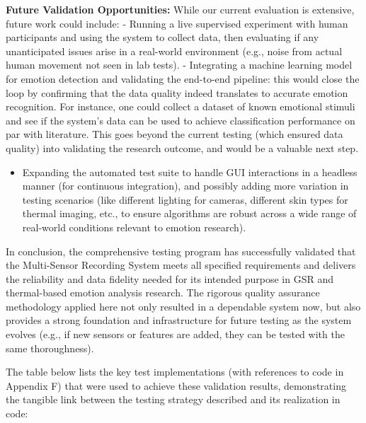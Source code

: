 \documentclass[11pt,a4paper]{report}
\begin{document}
{{\textbf{Future Validation Opportunities:} While our current evaluation is
extensive, future work could include: - Running a live supervised
experiment with human participants and using the system to collect data,
then evaluating if any unanticipated issues arise in a real-world
environment (e.g., noise from actual human movement not seen in lab
tests). - Integrating a machine learning model for emotion detection and
validating the end-to-end pipeline: this would close the loop by
confirming that the data quality indeed translates to accurate emotion
recognition. For instance, one could collect a dataset of known
emotional stimuli and see if the system's data can be used to achieve
classification performance on par with literature. This goes beyond the
current testing (which ensured data quality) into validating the
research outcome, and would be a valuable next step.

\begin{itemize}
\item Expanding the automated test suite to handle GUI interactions in a
  headless manner (for continuous integration), and possibly adding more
  variation in testing scenarios (like different lighting for cameras,
  different skin types for thermal imaging, etc., to ensure algorithms
  are robust across a wide range of real-world conditions relevant to
  emotion research).

\end{itemize}
In conclusion, the comprehensive testing program has successfully
validated that the Multi-Sensor Recording System meets all specified
requirements and delivers the reliability and data fidelity needed for
its intended purpose in GSR and thermal-based emotion analysis research.
The rigorous quality assurance methodology applied here not only
resulted in a dependable system now, but also provides a strong
foundation and infrastructure for future testing as the system evolves
(e.g., if new sensors or features are added, they can be tested with the
same thoroughness).

The table below lists the key test implementations (with references to
code in Appendix F) that were used to achieve these validation results,
demonstrating the tangible link between the testing strategy described
and its realization in code:

}}
\end{document}
